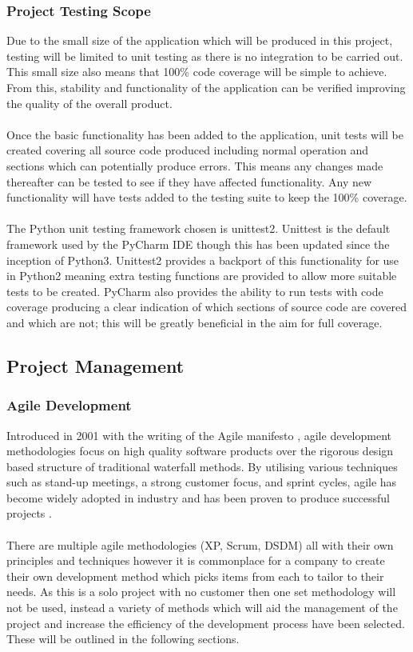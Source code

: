 	\subsubsection{Project Testing Scope}
		Due to the small size of the application which will be produced in this project, testing will be limited to unit testing as there is no integration to be carried out. This small size also means that 100\% code coverage will be simple to achieve. From this, stability and functionality of the application can be verified improving the quality of the overall product.
		\\\\
		Once the basic functionality has been added to the application, unit tests will be created covering all source code produced including normal operation and sections which can potentially produce errors. This means any changes made thereafter can be tested to see if they have affected functionality. Any new functionality will have tests added to the testing suite to keep the 100\% coverage.
		\\\\
		The Python unit testing framework chosen is unittest2. Unittest is the default framework used by the PyCharm IDE though this has been updated since the inception of Python3. Unittest2 provides a backport of this functionality for use in Python2 meaning extra testing functions are provided to allow more suitable tests to be created. PyCharm also provides the ability to run tests with code coverage producing a clear indication of which sections of source code are covered and which are not; this will be greatly beneficial in the aim for full coverage.
\subsection{Project Management}\label{sec:project_management}
	\subsubsection{Agile Development}
		Introduced in 2001 with the writing of the Agile manifesto \citep{beck2001manifesto}, agile development methodologies focus on high quality software products over the rigorous design based structure of traditional waterfall methods. By utilising various techniques such as stand-up meetings, a strong customer focus, and sprint cycles, agile has become widely adopted in industry and has been proven to produce successful projects \citep{state_of_agile_2015}.
		\\\\
		There are multiple agile methodologies (XP, Scrum, DSDM) all with their own principles and techniques however it is commonplace for a company to create their own development method which picks items from each to tailor to their needs. As this is a solo project with no customer then one set methodology will not be used, instead a variety of methods which will aid the management of the project and increase the efficiency of the development process have been selected. These will be outlined in the following sections.
